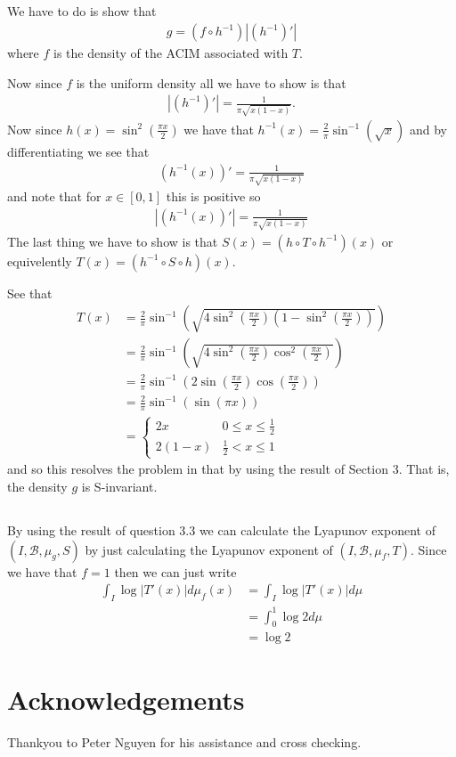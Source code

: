 \documentclass{unswmaths}
\begin{document}
\subsection{}
We have to do is show that 
\begin{align}
  g = (f \circ h^{-1})|\left( h^{-1} \right)'|
\end{align}
where $ f $ is the density of the ACIM associated with $ T $.

Now since $ f $ is the uniform density all we have to show is that
\begin{align}
 |\left( h^{-1} \right)'| = \frac{1}{\pi\sqrt{x(1-x)}}.
\end{align}
Now since $ h(x) = \sin^2(\frac{\pi x}{2}) $ we have that $ h^{-1}(x) = \frac{2}{\pi} \sin^{-1}(\sqrt{x}) $ and by differentiating we see that
\begin{align}
  \left( h^{-1}(x) \right)' = \frac{1}{\pi\sqrt{x(1-x)}}
\end{align}
and note that for $ x \in [0,1] $ this is positive so 
\begin{align}
| (h^{-1}(x))' | = \frac{1}{\pi\sqrt{x(1-x)}}
\end{align}
The last thing we have to show is that $ S(x) = \left( h \circ T \circ h^{-1} \right)(x) $ or equivelently $ T(x) = \left(h^{-1} \circ S \circ h \right)(x) $.

See that
\begin{align}
  T(x) &= \frac{2}{\pi} \sin^{-1}\left( \sqrt{4\sin^2\left(\frac{\pi  x}{2}\right)\left(1-\sin^2\left(\frac{\pi  x}{2}\right)\right) } \right) \\
    &= \frac{2}{\pi} \sin^{-1}\left( \sqrt{4\sin^2\left(\frac{\pi  x}{2}\right)\cos^2\left(\frac{\pi  x}{2}\right) } \right) \\
    &= \frac{2}{\pi} \sin^{-1}\left( 2 \sin\left(\frac{\pi  x}{2}\right)\cos\left(\frac{\pi  x}{2}\right) \right) \\
    &= \frac{2}{\pi} \sin^{-1}\left(  \sin\left(\pi  x\right)\right) \\
    &= \begin{cases} 2x & 0 \leq x \leq \frac{1}{2} \\ 2(1-x)  & \frac{1}{2} < x \leq 1 \end{cases}
\end{align}
and so this resolves the problem in that by using the result of Section 3.
That is, the density $ g $ is S-invariant.

\subsection{}
By using the result of question 3.3 we can calculate the  Lyapunov exponent of $ (I, \mathcal{B}, \mu_g, S) $ by just calculating the  Lyapunov exponent of $ (I, \mathcal{B}, \mu_f, T ) $. Since we have that $ f = 1 $ then we can just write
\begin{align}
  \int_{I} \log |T'(x)| d\mu_f(x) &= \int_{I} \log |T'(x)| d\mu \\
    &= \int_{0}^{1} \log 2 d\mu \\
    &= \log 2
\end{align}

\section{Acknowledgements}
Thankyou to Peter Nguyen for his assistance and cross checking.
\end{document}

